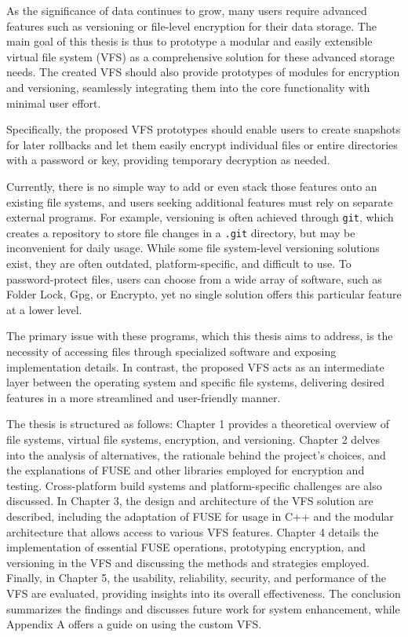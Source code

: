 
As the significance of data continues to grow, many users require advanced features such as versioning or file-level encryption for their data storage.
The main goal of this thesis is thus to prototype a modular and easily extensible virtual file system (VFS) as a comprehensive solution for these advanced storage needs.
The created VFS should also provide prototypes of modules for encryption and versioning, seamlessly integrating them into the core functionality with minimal user effort.

Specifically, the proposed VFS prototypes should enable users to create snapshots for later rollbacks and let them easily encrypt individual files or entire directories with a password or key, providing temporary decryption as needed.

Currently, there is no simple way to add or even stack those features onto an existing file systems, and users seeking additional features must rely on separate external programs.
For example, versioning is often achieved through \texttt{git}, which creates a repository to store file changes in a \texttt{.git} directory, but may be inconvenient for daily usage.
While some file system-level versioning solutions exist, they are often outdated, platform-specific, and difficult to use.
To password-protect files, users can choose from a wide array of software, such as Folder Lock, Gpg, or Encrypto, yet no single solution offers this particular feature at a lower level.

The primary issue with these programs, which this thesis aims to address, is the necessity of accessing files through specialized software and exposing implementation details.
In contrast, the proposed VFS acts as an intermediate layer between the operating system and specific file systems, delivering desired features in a more streamlined and user-friendly manner.

The thesis is structured as follows: Chapter 1 provides a theoretical overview of file systems, virtual file systems, encryption, and versioning.
Chapter 2 delves into the analysis of alternatives, the rationale behind the project's choices, and the explanations of FUSE and other libraries employed for encryption and testing.
Cross-platform build systems and platform-specific challenges are also discussed.
In Chapter 3, the design and architecture of the VFS solution are described, including the adaptation of FUSE for usage in C++ and the modular architecture that allows access to various VFS features.
Chapter 4 details the implementation of essential FUSE operations, prototyping encryption, and versioning in the VFS and discussing the methods and strategies employed.
Finally, in Chapter 5, the usability, reliability, security, and performance of the VFS are evaluated, providing insights into its overall effectiveness.
The conclusion summarizes the findings and discusses future work for system enhancement, while Appendix A offers a guide on using the custom VFS.
